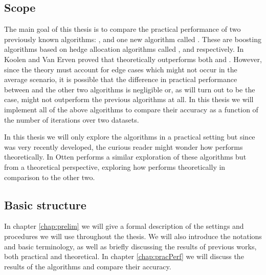 \subsection{Scope}

The main goal of this thesis is to compare the practical performance of two previously known algorithms: \adaB, \NHB and one new algorithm called \squintB. These are boosting algorithms based on hedge allocation algorithms called \hedge, \adaN and \squint respectively. In \cite{Koolen2015} Koolen and Van Erven proved that \squint theoretically outperforms both \hedge and \adaN. However, since the theory must account for edge cases which might not occur in the average scenario, it is possible that the difference in practical performance between \squint and the other two algorithms is negligible or, as will turn out to be the case, \squintB might not outperform the previous algorithms at all. In this thesis we will implement all of the above algorithms to compare their accuracy as a function of the number of iterations over two datasets.

\par In this thesis we will only explore the algorithms in a practical setting but since \squint was very recently developed, the curious reader might wonder how \squintB performs theoretically. In \cite{Otten2016} Otten performs a similar exploration of these algorithms but from a theoretical perspective, exploring how \squintB performs theoretically in comparison to the other two. 

\subsection{Basic structure}
In chapter \ref{chap:prelim} we will give a formal description of the settings and procedures we will use throughout the thesis. We will also introduce the notations and basic terminology, as well as briefly discussing the results of previous works, both practical and theoretical. In chapter \ref{chap:pracPerf} we will discuss the results of the algorithms and compare their accuracy.